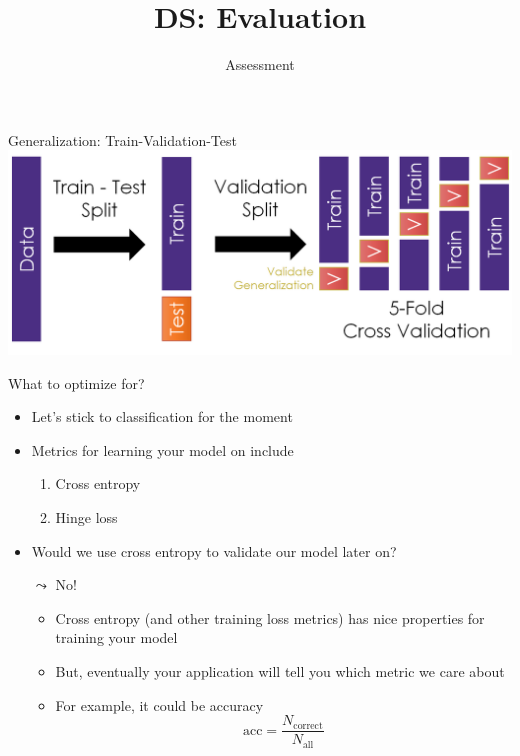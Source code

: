 \documentclass[aspectratio=169]{../latex_main/tntbeamer}  %
\title[Evaluation]{DS: Evaluation}
\subtitle{Assessment}
\begin{document}
	
	\maketitle
	
	\begin{frame}{Generalization: Train-Validation-Test}
	       \includegraphics[scale=.43]{Bild4}\\
	\end{frame}
	
	\begin{frame}[c]{What to optimize for?}
	    \begin{itemize}
	        \item Let's stick to classification for the moment
                \medskip
                \item Metrics for learning your model on include
                    \begin{enumerate}
                        \item Cross entropy
                        \item Hinge loss
                    \end{enumerate}
                \item Would we use cross entropy to validate our model later on?
                \break
                \item[$\leadsto$] No!
                \begin{itemize}
                    \item Cross entropy (and other training loss metrics) has nice properties for training your model
                    \item But, eventually your application will tell you which metric we care about
                    \item For example, it could be accuracy
                    $$ \text{acc} = \frac{N_{\text{correct}}}{N_{\text{all}}} $$
                \end{itemize}
	    \end{itemize}
	\end{frame}
\end{document}
